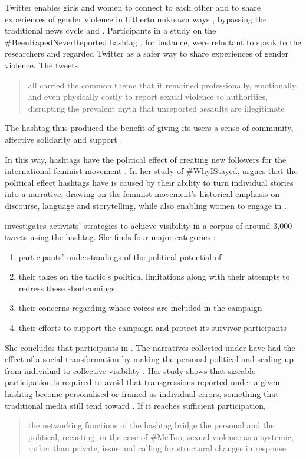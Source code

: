 \documentclass[output=paper,english,spanish,german,english]{langsci/langscibook}
\begin{document}
Twitter enables girls and women to connect to each other and to share experiences of gender violence in hitherto unknown ways \parencite{keletal18}, bypassing the traditional news cycle and . Participants in a study on the \#BeenRapedNeverReported hashtag \parencite{keletal18}, for instance, were reluctant to speak to the researchers and regarded Twitter as a safer way to share experiences of gender violence. The tweets \blockcquote[27]{keletal18}{all carried the common theme that it remained professionally, emotionally, and even physically costly to report sexual violence to authorities, disrupting the prevalent myth that unreported assaults are illegitimate}. The hashtag thus produced the benefit of giving its users a sense of community, affective solidarity and support \parencite[28--29]{keletal18}.

\newpage
In this way, hashtags have the political effect of creating new followers for the international feminist movement \parencites{schwin05}[238]{menetal18}. In her study of \#WhyIStayed, \textcite[789]{clark16} argues that the political effect hashtags have is caused by their ability to turn individual stories into a narrative, drawing on the feminist movement's historical emphasis on discourse, language and storytelling, while also enabling women to engage in .

\textcite{clark19} investigates activists' strategies to achieve visibility in a corpus of around 3,000 tweets using the \mt hashtag. She finds four major categories \parencite[7]{clark19}: 

\begin{enumerate}
  \item participants’ understandings of the political potential of \mt
  \item their takes on the tactic’s political limitations along with their attempts to redress these shortcomings
  \item their concerns regarding whose voices are included in the campaign
  \item their efforts to support the campaign and protect its survivor-participants
\end{enumerate}

\noindent She concludes that participants in \mt {}. The narratives collected under \mt have had the effect of a social transformation by making the personal political and scaling up from individual to collective visibility \parencite[16]{clark19}. Her study shows that sizeable participation is required to avoid that transgressions reported under a given hashtag become personalised or framed as individual errors, something that traditional media still tend toward \parencite[383]{kornemann18}. If it reaches sufficient participation, \blockcquote[16]{clark19}{the networking functions of the hashtag bridge the personal and the political, recasting, in the case of \#MeToo, sexual violence as a systemic, rather than private, issue and calling for structural changes in response}.
\end{document}
